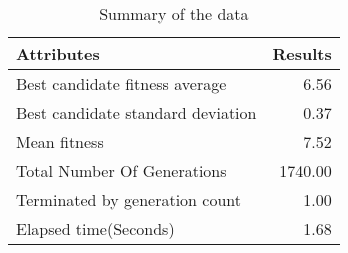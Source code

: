 \begin{table}[ht]
\centering
\begin{tabular}{lr}
  \hline
Attributes & Results \\ 
  \hline
Best candidate fitness average & 6.56 \\ 
  Best candidate standard deviation & 0.37 \\ 
  Mean fitness & 7.52 \\ 
  Total Number Of Generations & 1740.00 \\ 
  Terminated by generation count & 1.00 \\ 
  Elapsed time(Seconds) & 1.68 \\ 
   \hline
\end{tabular}
\caption{Summary of the data} 
\label{table:summary}
\end{table}
